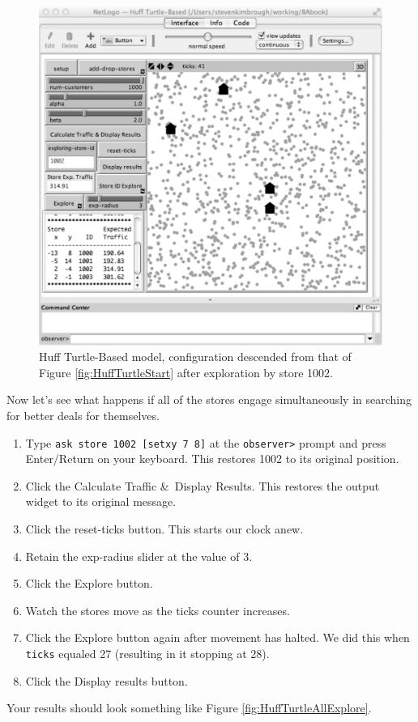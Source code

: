 \begin{figure}[htbp] %
   \centering
   \includegraphics[width=\textwidth]{figures/HuffTurtle1002Explore.pdf}  
   \caption{Huff Turtle-Based model, configuration descended from that of Figure \ref{fig:HuffTurtleStart} after exploration by store 1002.} %
   \label{fig:HuffTurtle1002Explore}
\end{figure}

\newpage\clearpage

Now let's see what happens if all of the stores engage simultaneously in searching for better deals for themselves. 
\begin{enumerate}
\item Type {\tt ask store 1002 [setxy 7 8]} at the {\tt observer>} prompt and press Enter/Return on your keyboard. This restores 1002 to its original position.
\item Click the Calculate Traffic \&\ Display Results. This restores the output widget to its original message.
\item Click the reset-ticks button. This starts our clock anew.
\item Retain the exp-radius slider at the value of 3.
\item Click the Explore button.
\item Watch the stores move as the ticks counter increases.
\item Click the Explore button again after movement has halted. We did this when {\tt ticks} equaled 27 (resulting in it stopping at 28).
\item Click the Display results button.
\end{enumerate}
Your results should look something like Figure \ref{fig:HuffTurtleAllExplore}.



